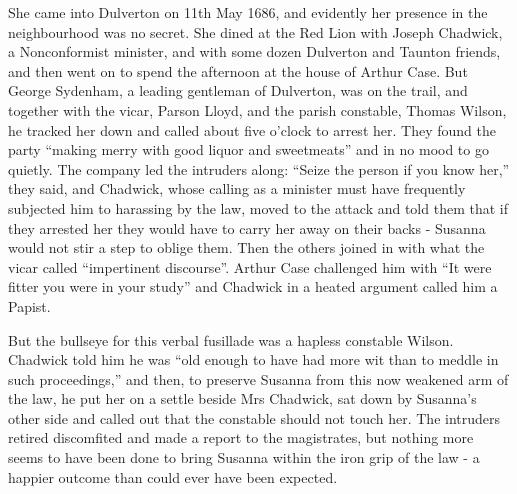 She came into Dulverton on 11th May 1686, and evidently her presence in the neighbourhood was no secret. She dined at the Red Lion with Joseph Chadwick, a Nonconformist minister, and with some dozen Dulverton and Taunton friends, and then went on to spend the afternoon at the house of Arthur Case. But George Sydenham, a leading gentleman of Dulverton, was on the trail, and together with the vicar, Parson Lloyd, and the parish constable, Thomas Wilson, he tracked her down and called about five o’clock to arrest her. They found the party “making merry with good liquor and sweetmeats” and in no mood to go quietly.	
The company led the intruders along: “Seize the person if you know her,” they said, and Chadwick, whose calling as a minister must have frequently subjected him to harassing by the law, moved to the attack and told them that if they arrested her they would have to carry her away on their backs - Susanna would not stir a step to oblige them. Then the others joined in with what the vicar called “impertinent discourse”. Arthur Case challenged him with “It were fitter you were in your study” and Chadwick in a heated argument called him a Papist.

But the bullseye for this verbal fusillade was a hapless constable Wilson. Chadwick told him he was “old enough to have had more wit than to meddle in such proceedings,” and then, to preserve Susanna from this now weakened arm of the law, he put her on a settle beside Mrs Chadwick, sat down by Susanna’s other side and called out that the constable should not touch her. The intruders retired discomfited and made a report to the magistrates, but nothing more seems to have been done to bring Susanna within the iron grip of the law - a happier outcome than could ever have been expected.